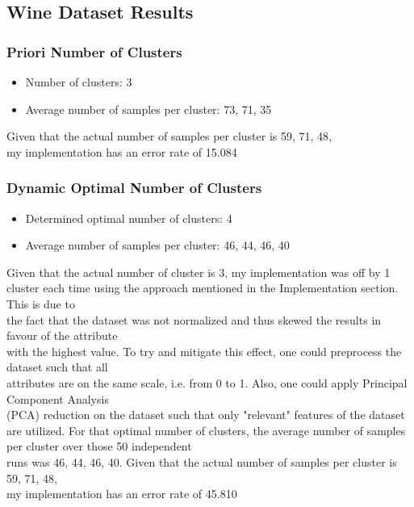 \begin{flushleft}
    \subsection{Wine Dataset Results}
        \subsubsection{Priori Number of Clusters}
            \begin{itemize}
                \item Number of clusters: 3
                \item Average number of samples per cluster: {73, 71, 35}
            \end{itemize}
            Given that the actual number of samples per cluster is {59, 71, 48}, \\
            my implementation has an error rate of 15.084%
        \subsubsection{Dynamic Optimal Number of Clusters}
            \begin{itemize}
                \item Determined optimal number of clusters: 4
                \item Average number of samples per cluster: {46, 44, 46, 40}
            \end{itemize}
            Given that the actual number of cluster is 3, my implementation was off by 1 \\
            cluster each time using the approach mentioned in the Implementation section. This is due to \\
            the fact that the dataset was not normalized and thus skewed the results in favour of the attribute \\
            with the highest value. To try and mitigate this effect, one could preprocess the dataset such that all \\
            attributes are on the same scale, i.e. from 0 to 1. Also, one could apply Principal Component Analysis \\
            (PCA) reduction on the dataset such that only "relevant" features of the dataset are utilized.
            For that optimal number of clusters, the average number of samples per cluster over those 50 independent \\
            runs was {46, 44, 46, 40}. Given that the actual number of samples per cluster is {59, 71, 48}, \\
            my implementation has an error rate of 45.810%


\end{flushleft}
